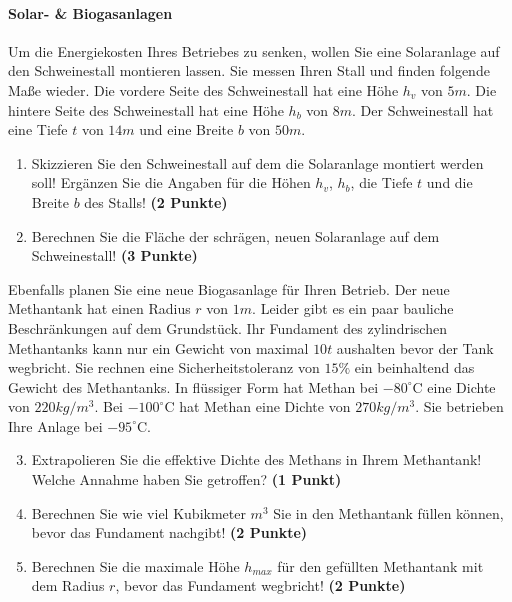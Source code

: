 \documentclass[a4paper, 9pt]{scrartcl}\usepackage[]{graphicx}\usepackage[]{xcolor}
\begin{document}
\paragraph{Solar- \& Biogasanlagen}



Um die Energiekosten Ihres Betriebes zu senken, wollen Sie eine Solaranlage
auf den Schweinestall montieren lassen. Sie messen Ihren Stall und finden
folgende Ma{\ss}e wieder. Die vordere Seite des Schweinestall hat eine H{\"o}he
$h_v$ von $5m$. Die hintere Seite des Schweinestall hat eine
H{\"o}he $h_b$ von $8m$. Der Schweinestall hat eine Tiefe $t$ von
$14m$ und eine Breite $b$ von $50m$.

\begin{enumerate}
\item Skizzieren Sie den Schweinestall auf dem die Solaranlage montiert
  werden soll! Erg{\"a}nzen Sie die Angaben f{\"u}r die H{\"o}hen $h_v$, $h_b$, die
  Tiefe $t$ und die Breite $b$ des Stalls!  \textbf{(2 Punkte)}
\item Berechnen Sie die Fl{\"a}che der schr{\"a}gen, neuen Solaranlage auf dem
  Schweinestall! \textbf{(3 Punkte)}
\end{enumerate}

Ebenfalls planen Sie eine neue Biogasanlage f{\"u}r Ihren Betrieb. Der neue
Methantank hat einen Radius $r$ von $1m$. Leider gibt es ein
paar bauliche Beschr{\"a}nkungen auf dem Grundst{\"u}ck. Ihr Fundament des
zylindrischen Methantanks kann nur ein Gewicht von maximal
$10t$ aushalten bevor der Tank wegbricht. Sie rechnen eine
Sicherheitstoleranz von $15\%$ ein beinhaltend das Gewicht des
Methantanks. In fl{\"u}ssiger Form hat
Methan bei $-80^\circ\text{C}$ eine Dichte von
$220kg/m^3$. Bei $-100^\circ\text{C}$ hat Methan eine Dichte
von $270kg/m^3$. Sie betrieben Ihre Anlage bei
$-95^\circ\text{C}$.

\begin{enumerate}
  \setcounter{enumi}{2}
\item Extrapolieren Sie die effektive Dichte des Methans in Ihrem
  Methantank! Welche Annahme haben Sie getroffen? \textbf{(1 Punkt)}
\item Berechnen Sie wie viel Kubikmeter $m^3$ Sie in den Methantank f{\"u}llen
  k{\"o}nnen, bevor das Fundament nachgibt! \textbf{(2 Punkte)}
\item Berechnen Sie die maximale H{\"o}he $h_{max}$ f{\"u}r den gef{\"u}llten
  Methantank mit dem Radius $r$, bevor das Fundament wegbricht! \textbf{(2
    Punkte)}
\end{enumerate}
\end{document}
